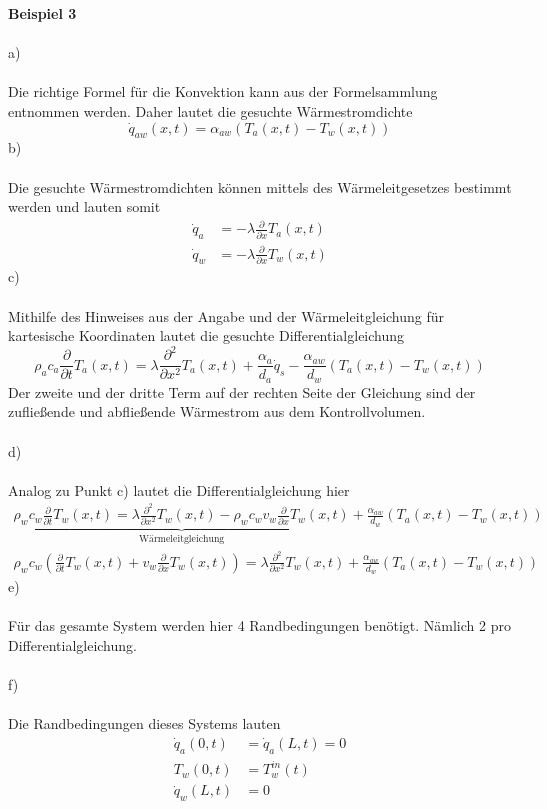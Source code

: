 \newpage
\noindent
\textbf{Beispiel 3}\\ \\
a)\\ \\
Die richtige Formel für die Konvektion kann aus der Formelsammlung entnommen werden. Daher lautet die gesuchte Wärmestromdichte
\[
	\dot{q}_{aw}(x,t) = \alpha_{aw}\left(T_a(x,t) - T_w(x,t)\right)
\]
b)\\ \\
Die gesuchte Wärmestromdichten können mittels des Wärmeleitgesetzes bestimmt werden und lauten somit
\begin{align*}
	\dot{q}_a &= -\lambda\frac{\partial}{\partial x}T_a(x,t) \\
	\dot{q}_w &= -\lambda\frac{\partial}{\partial x}T_w(x,t)
\end{align*}
c)\\ \\
Mithilfe des Hinweises aus der Angabe und der Wärmeleitgleichung für kartesische Koordinaten lautet die gesuchte Differentialgleichung
\[
	\rho_a c_a \frac{\partial}{\partial t}T_a(x,t) = \lambda\frac{\partial^2}{\partial x^2}T_a(x,t) + \frac{\alpha_a}{d_a}\dot{q}_s - \frac{\alpha_{aw}}{d_w}\left(T_a(x,t) - T_w(x,t)\right)
\]
Der zweite und der dritte Term auf der rechten Seite der Gleichung sind der zufließende und abfließende Wärmestrom aus dem Kontrollvolumen. \\ \\
d)\\ \\
Analog zu Punkt c) lautet die Differentialgleichung hier
\begin{align*}
	\underbrace{\rho_wc_w\frac{\partial}{\partial t}T_w(x,t) = \lambda\frac{\partial^2}{\partial x^2}T_w(x,t) - \rho_wc_wv_w\frac{\partial}{\partial x}T_w(x,t)}_{\text{Wärmeleitgleichung}} + \frac{\alpha_{aw}}{d_w}\left(T_a(x,t) - T_w(x,t)\right) \\
	\rho_w c_w \left(\frac{\partial}{\partial t}T_w(x,t) + v_w\frac{\partial}{\partial x}T_w(x,t)\right) = \lambda\frac{\partial^2}{\partial x^2}T_w(x,t) + \frac{\alpha_{aw}}{d_w}\left(T_a(x,t) - T_w(x,t)\right)
\end{align*}
e)\\ \\
Für das gesamte System werden hier 4 Randbedingungen benötigt. Nämlich 2 pro Differentialgleichung.\\ \\
f)\\ \\
Die Randbedingungen dieses Systems lauten 
\begin{align*}
	\dot{q}_a(0,t) &= \dot{q}_a(L,t) = 0 \\
	T_w(0,t) &= T_w^{in}(t) \\
	\dot{q}_w(L,t) &= 0
\end{align*}